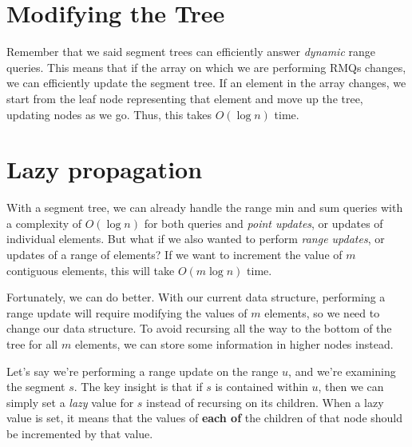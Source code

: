 \documentclass[11pt]{article}
\begin{document}
\section{Modifying the Tree}

Remember that we said segment trees can efficiently answer \textit{dynamic} range queries. This means that if the array on which we are performing RMQs changes, we can efficiently update the segment tree. If an element in the array changes, we start from the leaf node representing that element and move up the tree, updating nodes as we go. Thus, this takes $O(\log n)$ time.


\section{Lazy propagation}
With a segment tree, we can already handle the range min and sum queries with a complexity of $O(\log n)$ for both queries and \textit{point updates}, or updates of individual elements. But what if we also wanted to perform \textit{range updates}, or updates of a range of elements? If we want to increment the value of $m$ contiguous elements, this will take $O(m \log n)$ time.

Fortunately, we can do better. With our current data structure, performing a range update will require modifying the values of $m$ elements, so we need to change our data structure. To avoid recursing all the way to the bottom of the tree for all $m$ elements, we can store some information in higher nodes instead.

Let's say we're performing a range update on the range $u$, and we're examining the segment $s$. The key insight is that if $s$ is contained within $u$, then we can simply set a \textit{lazy} value for $s$ instead of recursing on its children. When a lazy value is set, it means that the values of \textbf{each of} the children of that node should be incremented by that value.
\end{document}
